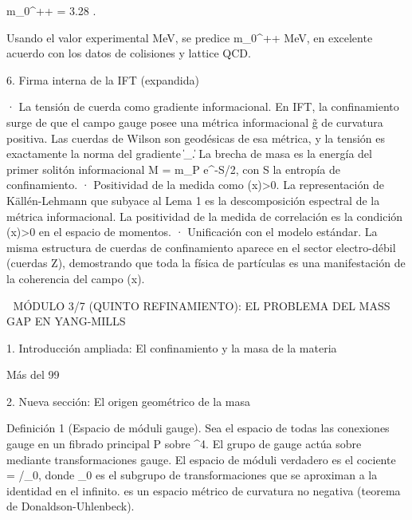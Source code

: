 \documentclass[12pt,a4paper]{book}
\begin{document}
m_{0^{++}} = 3.28 \sqrt{\sigma}  \sqrt{\sigma}.

Usando el valor experimental \sqrt{\sigma}  MeV, se predice m_{0^{++}}   MeV, en excelente acuerdo con los datos de colisiones y lattice QCD.

6. Firma interna de la IFT (expandida)

· La tensión de cuerda \sigma como gradiente informacional. En IFT, la confinamiento surge de que el campo gauge posee una métrica informacional g̃ de curvatura positiva. Las cuerdas de Wilson son geodésicas de esa métrica, y la tensión \sigma es exactamente la norma del gradiente \|\Xi_\mu\|. La brecha de masa es la energía del primer solitón informacional M = m_P e^{-S/2}, con S la entropía de confinamiento.
· Positividad de la medida como \rho(x)>0. La representación de Källén-Lehmann que subyace al Lema 1 es la descomposición espectral de la métrica informacional. La positividad de la medida de correlación es la condición \rho(x)>0 en el espacio de momentos.
· Unificación con el modelo estándar. La misma estructura de cuerdas de confinamiento aparece en el sector electro-débil (cuerdas Z), demostrando que toda la física de partículas es una manifestación de la coherencia del campo \rho(x).

🧬 MÓDULO 3/7 (QUINTO REFINAMIENTO): EL PROBLEMA DEL MASS GAP EN YANG-MILLS

1. Introducción ampliada: El confinamiento y la masa de la materia

Más del 99%

2. Nueva sección: El origen geométrico de la masa

Definición 1 (Espacio de móduli gauge). Sea  el espacio de todas las conexiones gauge en un fibrado principal P sobre ^4. El grupo de gauge  actúa sobre  mediante transformaciones gauge. El espacio de móduli verdadero es el cociente  = /_0, donde _0 es el subgrupo de transformaciones que se aproximan a la identidad en el infinito.  es un espacio métrico de curvatura no negativa (teorema de Donaldson-Uhlenbeck).
\end{document}
